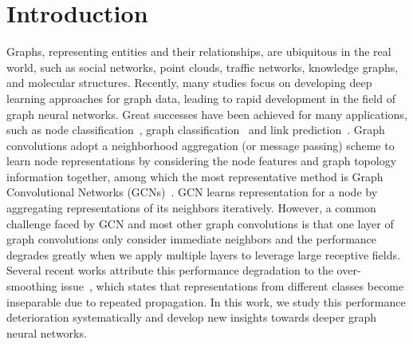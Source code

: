 \documentclass[sigconf]{acmart}
\begin{document}
\section{Introduction}
Graphs, representing entities and their relationships, are
ubiquitous in the real world, such as social networks, point
clouds, traffic networks, knowledge graphs, and molecular
structures. Recently, many studies focus on developing deep
learning approaches for graph data, leading to rapid development
in the field of graph neural networks. Great successes have been
achieved for many applications, such as node
classification~\cite{kipf2016semi,hamilton2017inductive,velivckovic2017graph,monti2017geometric,gao2018large,xu2018representation,klicpera2018predict,wu2019simplifying},
graph
classification~\cite{gilmer2017neural,ying2018hierarchical,zhang2018end,xu2018powerful,gao2019graph,lee2019self,ma2019graph,Yuan2020StructPool:}
and link prediction~\cite{zhang2017weisfeiler,zhang2018link, cai2020multi}.
Graph convolutions adopt a neighborhood aggregation (or message
passing) scheme to learn node representations by considering the
node features and graph topology information together, among
which the most representative method is Graph Convolutional
Networks (GCNs)~\cite{kipf2016semi}. GCN learns
representation for a node by aggregating representations of its
neighbors iteratively. However, a common challenge faced by GCN
and most other graph convolutions is that one layer of graph
convolutions only consider immediate neighbors and the performance
degrades greatly when we apply multiple layers to leverage large
receptive fields. Several recent works attribute this performance
degradation to the over-smoothing
issue~\cite{li2018deeper,xu2018representation,chen2019measuring},
which states that representations from different classes become
inseparable due to repeated propagation. In this work, we study
this performance deterioration systematically and develop new
insights towards deeper graph neural networks.
\end{document}
